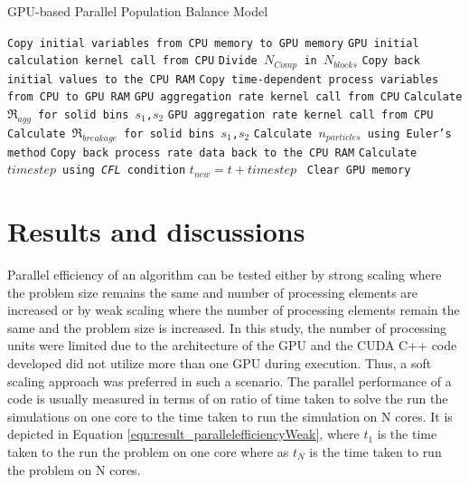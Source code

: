 \documentclass[preprint,10pt,authoryear,review]{elsarticle}
\begin{document}
\begin{linenumbers}
\begin{algorithm}
     \scriptsize
     \caption{GPU-based Parallel Population Balance Model}
     \label{alg:CPUparallelPBM}
     \begin{algorithmic}[1]
     \State\texttt{Copy initial variables from CPU memory to GPU memory}
     \State \texttt{GPU initial calculation kernel call from CPU}
     \State \texttt{Divide $N_{Comp}$ in $N_{blocks}$}
     \State \texttt{Copy back initial values to the CPU RAM}
	 \State \texttt{Copy time-dependent process variables from CPU to GPU RAM}
     \State \texttt{GPU aggregation rate kernel call from CPU}
     \State \texttt{Calculate $\Re_{agg}$ for solid bins $s_1$,$s_2$}
	 \State \texttt{GPU aggregation rate kernel call from CPU}     
     \State \texttt{Calculate $\Re_{breakage}$ for solid bins $s_1$,$s_2$}
     \State \texttt{Calculate $n_{particles}$ using Euler's method}
     \State \texttt{Copy back process rate data back to the CPU RAM}
     \State \texttt{Calculate $timestep$ using \textit{CFL} condition}
     \State \texttt{$t_{new} = t + timestep$ }
     \EndWhile
     \State \texttt{Clear GPU memory}
     \EndProcedure
     \end{algorithmic}
 \label{alg:parpbm}
 \end{algorithm}

\section{Results and discussions}
\label{secResults}

Parallel efficiency of an algorithm can be tested either by strong scaling 
where the problem size remains the same and number of processing elements 
are increased or by weak scaling where the number of processing elements 
remain the same and the problem size is increased. In this study, the 
number of processing units were limited due to the architecture of the 
GPU and the CUDA C++ code developed did not utilize more than one GPU 
during execution. Thus, a soft scaling approach was preferred in such a 
scenario. The parallel performance of a code is usually measured in 
terms of on ratio of time taken to solve the run the simulations on one 
core to the time taken to run the simulation on N cores. It is depicted in
Equation \ref{eqn:result_parallelefficiencyWeak}, where $t_1$ is the time taken 
to the run the problem on one core where as $t_N$ is the time taken to 
run the problem on N cores.


\end{linenumbers}
\end{document}
